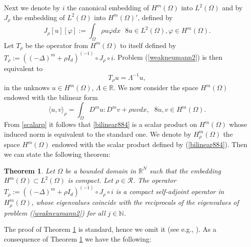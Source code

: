 \documentclass[11pt,a4paper]{amsart}
\numberwithin{equation}{section}
\newtheorem{thm}[equation]{Theorem}
\newcommand{\rea}{\mathbb{R}}
\begin{document}
Next we denote by $i$ the canonical embedding of $H^m(\Omega)$ into $L^2(\Omega)$ and by $J_\rho$ the embedding of $L^2(\Omega)$ into $H^m(\Omega)'$, defined by
$$
J_\rho[u][\varphi]:=\int_\Omega\rho u\varphi dx\ \ \ \mathcal8 u\in L^2(\Omega),\varphi\in H^m(\Omega).
$$
Let $T_\rho$ be the operator from $H^m(\Omega)$ to itself defined by $T_\rho:=((-\Delta)^m+\rho I_d)^{(-1)}\circ J_\rho\circ i$. Problem (\ref{weakneumann2}) is then equivalent to
\begin{equation*}
T_\rho u =\Lambda^{-1}u,
\end{equation*}
in the unknows $u\in H^m(\Omega)$, $\Lambda\in\rea$. We now consider the space $H^m(\Omega)$ endowed with the bilinear form
\begin{equation}\label{bilinear884}
\langle u,v\rangle_{\rho}=\int_\Omega D^mu:D^mv+\rho u v dx,\ \ \ \mathcal8 u,v\in H^m(\Omega).
\end{equation}
From \eqref{scalarp} it follows that \eqref{bilinear884} is a scalar product on $H^m(\Omega)$ whose induced norm is equivalent to the standard one. We denote by ${H^m_{\rho}}(\Omega)$ the space $H^m(\Omega)$ endowed with the scalar product defined by (\ref{bilinear884}). Then we can state the following theorem:

\begin{thm}\label{lemma_neumann_883}
Let $\Omega$ be a bounded domain in $\rea^N$ such that the embedding $H^m(\Omega)\subset L^2(\Omega)$ is compact. Let $\rho\in\mathcal R$. The operator $T_\rho:=((-\Delta)^m+\rho I_d)^{(-1)}\circ J_\rho\circ i$ is a compact self-adjoint operator in ${H^m_{\rho}}(\Omega)$, whose eigenvalues coincide with the reciprocals of the eigenvalues of problem (\ref{weakneumann2}) for all $j\in\mathbb N$.
\end{thm}
The proof of Theorem \ref{lemma_neumann_883} is standard, hence we omit it (see e.g., \cite[\S\,IX]{brezis}). As a consequence of Theorem \ref{lemma_neumann_883} we have the following:
\end{document}
